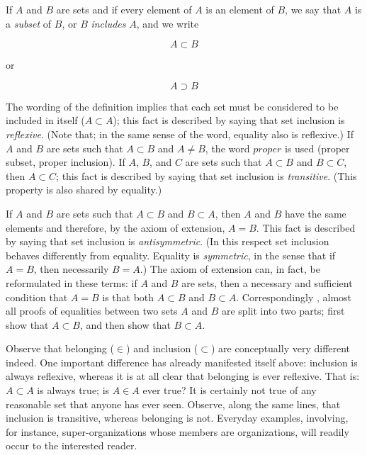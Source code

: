 If $A$ and $B$ are sets and if every element of $A$ is an element of $B$, we say that $A$ is a \textit{subset} of $B$, or $B$ \textit{includes} $A$, and we write 

\begin{equation*}
A \subset B
\end{equation*}

or

\begin{equation*}
A \supset B
\end{equation*}

The wording of the definition implies that each set must be considered to be included in itself ($A \subset A$); this fact is described by saying that set inclusion is \textit{reflexive}. (Note that; in the same sense of the word, equality also is reflexive.) If $A$ and $B$ are sets such that $A \subset B$ and $A \neq B$, the word $proper$ is used (proper subset, proper inclusion). If $A$, $B$, and $C$ are sets such that $A \subset B$ and $B \subset C$, then $A \subset C$; this fact is described by saying that set inclusion is \textit{transitive}. (This property is also shared by equality.)

If $A$ and $B$ are sets such that $A \subset B$ and $B \subset A$, then $A$ and $B$ have the same elements and therefore, by the axiom of extension, $A = B$. This fact is described by saying that set inclusion is \textit{antisymmetric}. (In this respect set inclusion behaves differently from equality. Equality is \textit{symmetric}, in the sense that if $A = B$, then necessarily $B = A$.) The axiom of extension can, in fact, be reformulated in these terms: if $A$ and $B$ are sets, then a necessary and sufficient condition that $A = B$ is that both $A \subset B$ and $B \subset A$. Correspondingly , almost all proofs of equalities between two sets $A$ and $B$ are split into two parts; first show that $A \subset B$, and then show that $B \subset A$. 

Observe that belonging ($ \in $) and inclusion ($ \subset$) are conceptually very different indeed. One important difference has already manifested itself above: inclusion is always reflexive, whereas it is at all clear that belonging is ever reflexive. That is: $A \subset A$ is always true; is $A \in A $ ever true? It is certainly not true of any reasonable set that anyone has ever seen. Observe, along the same lines, that inclusion is transitive, whereas belonging is not. Everyday examples, involving, for instance, super-organizations whose members are organizations, will readily occur to the interested reader.